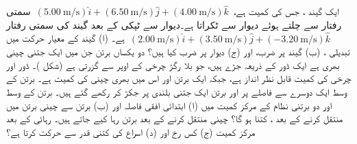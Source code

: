 ایک گیند ، جس کی کمیت  ہے، 
\(\,(\SI{5.00}{\meter\per\second})\hat{i}+(\SI{6.50}{\meter\per\second})\hat{j}+(\SI{4.00}{\meter\per\second})\hat{k}\,\)
سمتی رفتار سے چلتے ہوئے دیوار سے ٹکراتا ہے۔دیوار سے ٹپکی  کے بعد گیند  کی سمتی رفتار 
\(\,(\SI{2.00}{\meter\per\second})\hat{i}+(\SI{3.50}{\meter\per\second})\hat{j}+(\SI{-3.20}{\meter\per\second})\hat{k}\,\)
  ہے۔  (ا) گیند کے معیار حرکت میں تبدیلی ، (ب)  گیند  پر ضرب،  اور (ج) دیوار پر ضرب کیا ہیں؟
دو یکساں برتن جن میں  ایک جتنی   چینی بھری ہے ایک  ڈور کے ذریعہ جڑے ہیں، جو بلا رگڑ چرخی کے اوپر  سے گزرتی ہے (شکل )۔ ڈور اور چرخی کی کمیت قابل نظر انداز ہے، جبکہ  ایک  برتن اور اس میں بھری چینی کی کمیت  ہے۔ برتن کے  وسط ایک دوسرے سے  فاصلے پر اور برتن  ایک جتنی بلندی پر   جکڑ کر رکھے گئے ہیں۔ برتن  کے وسط  اور  دو برتنی نظام  کے مرکز کمیت میں (ا) ابتدائی  افقی فاصلہ  اور (ب) برتن  سے  چینی برتن  میں منتقل کرنے کے بعد  ، کتنا ہو گا؟ چینی منتقل کرنے کے بعد برتن رہا کیے جاتے ہیں۔ رہائی کے بعد مرکز کمیت  (ج) کس رخ  اور  (د)  اسراع  کی کتنی قدر  سے حرکت کرتا ہے؟
